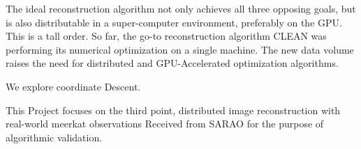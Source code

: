 The ideal reconstruction algorithm not only achieves all three opposing goals, but is also distributable in a super-computer environment, preferably on the GPU. This is a tall order. So far, the go-to reconstruction algorithm CLEAN was performing its numerical optimization on a single machine. The new data volume raises the need for distributed and GPU-Accelerated optimization algorithms.

We explore coordinate Descent.

This Project focuses on the third point, distributed image reconstruction with real-world meerkat observations
Received from SARAO for the purpose of algorithmic validation.

